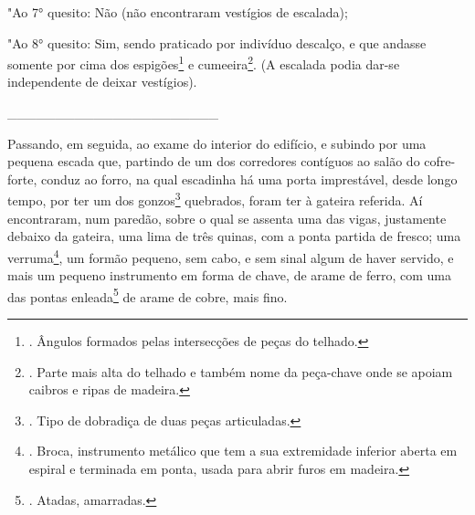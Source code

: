 "Ao 7° quesito: Não (não encontraram vestígios de escalada);

"Ao 8° quesito: Sim, sendo praticado por indivíduo descalço, e que
andasse somente por cima dos espigões\footnote{. Ângulos formados pelas
  intersecções de peças do telhado.} e cumeeira\footnote{. Parte mais
  alta do telhado e também nome da peça-chave onde se apoiam caibros e
  ripas de madeira.}. (A escalada podia dar-se independente de deixar
vestígios).

\_\_\_\_\_\_\_\_\_\_\_\_\_\_\_\_\_\_\_\_\_\_

Passando, em seguida, ao exame do interior do edifício, e subindo por
uma pequena escada que, partindo de um dos corredores contíguos ao salão
do cofre-forte, conduz ao forro, na qual escadinha há uma porta
imprestável, desde longo tempo, por ter um dos gonzos\footnote{. Tipo de
  dobradiça de duas peças articuladas.} quebrados, foram ter à gateira
referida. Aí encontraram, num paredão, sobre o qual se assenta uma das
vigas, justamente debaixo da gateira, uma lima de três quinas, com a
ponta partida de fresco; uma verruma\footnote{. Broca, instrumento
  metálico que tem a sua extremidade inferior aberta em espiral e
  terminada em ponta, usada para abrir furos em madeira.}, um formão
pequeno, sem cabo, e sem sinal algum de haver servido, e mais um pequeno
instrumento em forma de chave, de arame de ferro, com uma das pontas
enleada\footnote{. Atadas, amarradas.} de arame de cobre, mais fino.

